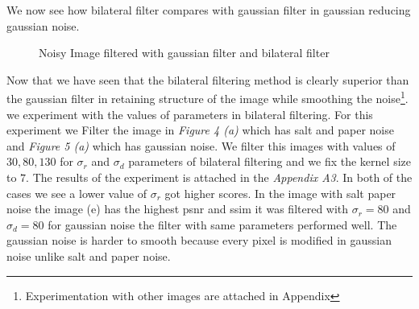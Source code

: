 \documentclass[a4paper, english]{article}
\begin{document}
We now see how bilateral filter compares with gaussian filter in gaussian reducing gaussian noise.

\begin{figure}[H]
\centering
    \caption{Noisy Image filtered with gaussian filter and bilateral filter}
\end{figure}

Now that we have seen that the bilateral filtering method is clearly superior than the gaussian filter in retaining structure of the image while smoothing the noise\footnote{Experimentation with other images are attached in Appendix}. we experiment with the values of parameters in bilateral filtering. For this experiment we Filter the image in \textit{Figure 4 (a)} which has salt and paper noise and \textit{Figure 5 (a)} which has gaussian noise. We filter this images with values of $30, 80, 130$ for $\sigma_r$ and $\sigma_d$ parameters of bilateral filtering and we fix the kernel size to $7$. The results of the experiment is attached in the \textit{Appendix A3}. In both of the cases we see a lower value of $\sigma_r$ got higher scores. In the image with salt paper noise the image (e) has the highest psnr and ssim it was filtered with $\sigma_r = 80$ and $\sigma_d = 80$ for gaussian noise the filter with same parameters performed well. The gaussian noise is harder to smooth because every pixel is modified in gaussian noise unlike salt and paper noise.
\end{document}
